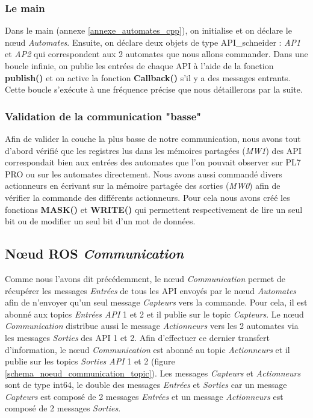 \documentclass[a4paper,french, titlepage]{book}
\begin{document}
\subsubsection{Le main}

Dans le main (annexe \ref{annexe_automates_cpp}), on initialise et on déclare le nœud \textit{Automates}. Ensuite, on déclare deux objets de type API\_schneider : \emph{AP1} et \emph{AP2} qui correspondent aux 2 automates que nous allons commander. Dans une boucle infinie, on publie les entrées de chaque API à l'aide de la fonction \textbf{publish()} et on active la fonction \textbf{Callback()} s'il y a des messages entrants. Cette boucle s'exécute à une fréquence précise que nous détaillerons par la suite.

\subsubsection{Validation de la communication "basse"}

Afin de valider la couche la plus basse de notre communication, nous avons tout d'abord vérifié que les registres lus dans les mémoires partagées (\emph{MW1}) des API correspondait bien aux entrées des automates que l'on pouvait observer sur PL7 PRO ou sur les automates directement. Nous avons aussi commandé divers actionneurs en écrivant sur la mémoire partagée des sorties (\emph{MW0}) afin de vérifier la commande des différents actionneurs. Pour cela nous avons créé les fonctions \textbf{MASK()} et \textbf{WRITE()} qui permettent respectivement de lire un seul bit ou de modifier un seul bit d'un mot de données.

\subsection{Nœud ROS \textit{Communication}}

Comme nous l'avons dit précédemment, le nœud \emph{Communication} permet de récupérer les messages \emph{Entrées} de tous les API envoyés par le nœud \emph{Automates} afin de n'envoyer qu'un seul message \emph{Capteurs} vers la commande. Pour cela, il est abonné aux topics \emph{Entrées API} 1 et 2 et il publie sur le topic \emph{Capteurs}. Le nœud \emph{Communication} distribue aussi le message \emph{Actionneurs} vers les 2 automates via les messages \emph{Sorties} des API 1 et 2. Afin d'effectuer ce dernier transfert d'information, le nœud \emph{Communication} est abonné au topic \emph{Actionneurs} et il publie sur les topics \emph{Sorties API} 1 et 2 (figure \ref{schema_noeud_communication_topic}). Les messages \emph{Capteurs} et \emph{Actionneurs} sont de type int64, le double des messages \emph{Entrées} et \emph{Sorties} car un message \emph{Capteurs} est composé de 2 messages \emph{Entrées} et un message \emph{Actionneurs} est composé de 2 messages \emph{Sorties}.
\end{document}

